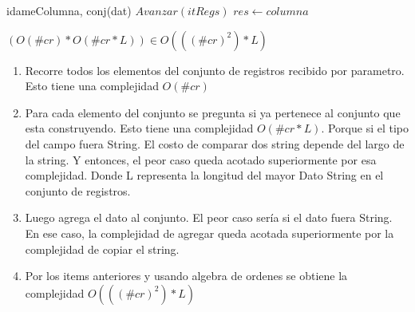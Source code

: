\begin{Algoritmos}
\begin{algoritmo}{idameColumna}{, }{conj(dat)}
{{        }
        $Avanzar(itRegs) $ 
    }
	$res \gets columna $ 
  \end{algoritmo}
  \datosAlgoritmo{} %
  {} %
  {} %
  {$ (O(\#cr)*O(\#cr*L)) \in O(((\#cr)^2)*L)$} %
  {
	  \begin{enumerate}
		\item Recorre todos los elementos del conjunto de registros recibido por parametro. Esto tiene una complejidad $O(\#cr)$
		\item Para cada elemento del conjunto se pregunta si ya pertenece al conjunto que esta construyendo. Esto tiene una complejidad $O(\#cr*L)$. Porque si el tipo del campo fuera String. El costo de comparar dos string depende del largo de la string. Y entonces, el peor caso queda acotado superiormente por esa complejidad. Donde L representa la longitud del mayor Dato String en el conjunto de registros.
        \item Luego agrega el dato al conjunto. El peor caso ser\'ia si el dato fuera String. En ese caso, la complejidad de agregar queda acotada superiormente por la complejidad de copiar el string. 
        \item Por los items anteriores y usando algebra de ordenes se obtiene la complejidad $O(((\#cr)^2)*L)$
    \end{enumerate}
  } %
  
\end{Algoritmos}